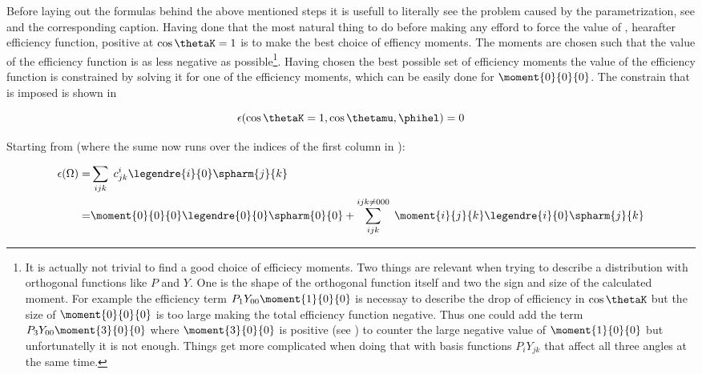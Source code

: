 Before laying out the formulas behind the above mentioned steps it is usefull to literally see the problem caused by the parametrization, see 
and the corresponding caption. Having done that the most natural thing to do before making any efford to force the value of , hearafter efficiency function,
positive at $\cos\thetaK=1$ is to make the best choice of effiency moments. The moments are chosen such that the value of the efficiency function is as less negative
as 
possible\footnote{It is actually not trivial to find a good choice of efficiecy moments. Two things are relevant when trying to describe a 
distribution with orthogonal functions like $P$ and $Y$. One is the shape of the orthogonal function itself and two the sign and size of the calculated moment.
For example the efficiency term $P_1Y_{00}\moment{1}{0}{0}$ is necessay to describe the drop of efficiency in $\cos\thetaK$ but the size of $\moment{0}{0}{0}$ 
is too large making the total efficiency function negative. Thus one could add the term $P_3Y_{00}\moment{3}{0}{0}$ where $\moment{3}{0}{0}$ is positive
(see  ) to counter the large negative value of $\moment{1}{0}{0}$ but unfortunatelly it is not enough. Things get more complicated
when doing that with basis functions $P_iY_{jk}$ that affect all three angles at the same time.
}.
Having chosen the best possible set of efficiency moments the value of the efficiency function is constrained by solving it for
one of the efficiency moments, which can be easily done for $\moment{0}{0}{0}$. The constrain that is imposed is shown in 

\begin{center}
\begin{equation}
  \epsilon(\cos\thetaK = 1, \cos\thetamu, \phihel) = 0 
  \label{eff_func_constr}
\end{equation}
\end{center}

\noindent Starting from  (where the sume now runs over the indices of the first column in ):

\begin{center}
\begin{align}
  \epsilon(\Omega) =& \sum_{ijk} \; c^i_{jk} \legendre{i}{0} \spharm{j}{k} \nonumber \\
                   =& \moment{0}{0}{0} \legendre{0}{0} \spharm{0}{0} + \sum_{ijk}^{ijk\neq 000} \; \moment{i}{j}{k} \legendre{i}{0} \spharm{j}{k}
  \label{eff_func_rewriten}
\end{align}
\end{center}


